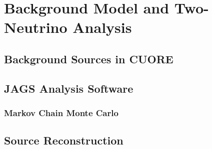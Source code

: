 \chapter{Background Model and Two-Neutrino Analysis}

\section{Background Sources in CUORE}

\section{JAGS Analysis Software}
\subsection{Markov Chain Monte Carlo}

\section{Source Reconstruction}